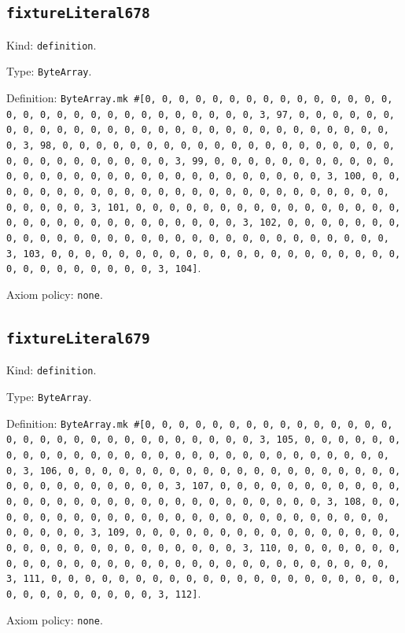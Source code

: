 \documentclass[11pt]{article}
\begin{document}
\subsection*{\texttt{fixtureLiteral678}}
\noindent Kind: \texttt{definition}.\par
\noindent Type: \texttt{ByteArray}.\par
\noindent Definition: \texttt{ByteArray.mk \#[0, 0, 0, 0, 0, 0, 0, 0, 0, 0, 0, 0, 0, 0, 0, 0, 0, 0, 0, 0, 0, 0, 0, 0, 0, 0, 0, 0, 0, 0, 3, 97, 0, 0, 0, 0, 0, 0, 0, 0, 0, 0, 0, 0, 0, 0, 0, 0, 0, 0, 0, 0, 0, 0, 0, 0, 0, 0, 0, 0, 0, 0, 3, 98, 0, 0, 0, 0, 0, 0, 0, 0, 0, 0, 0, 0, 0, 0, 0, 0, 0, 0, 0, 0, 0, 0, 0, 0, 0, 0, 0, 0, 0, 0, 3, 99, 0, 0, 0, 0, 0, 0, 0, 0, 0, 0, 0, 0, 0, 0, 0, 0, 0, 0, 0, 0, 0, 0, 0, 0, 0, 0, 0, 0, 0, 0, 3, 100, 0, 0, 0, 0, 0, 0, 0, 0, 0, 0, 0, 0, 0, 0, 0, 0, 0, 0, 0, 0, 0, 0, 0, 0, 0, 0, 0, 0, 0, 0, 3, 101, 0, 0, 0, 0, 0, 0, 0, 0, 0, 0, 0, 0, 0, 0, 0, 0, 0, 0, 0, 0, 0, 0, 0, 0, 0, 0, 0, 0, 0, 0, 3, 102, 0, 0, 0, 0, 0, 0, 0, 0, 0, 0, 0, 0, 0, 0, 0, 0, 0, 0, 0, 0, 0, 0, 0, 0, 0, 0, 0, 0, 0, 0, 3, 103, 0, 0, 0, 0, 0, 0, 0, 0, 0, 0, 0, 0, 0, 0, 0, 0, 0, 0, 0, 0, 0, 0, 0, 0, 0, 0, 0, 0, 0, 0, 3, 104]}.\par
\noindent Axiom policy: \texttt{none}.\par
\subsection*{\texttt{fixtureLiteral679}}
\noindent Kind: \texttt{definition}.\par
\noindent Type: \texttt{ByteArray}.\par
\noindent Definition: \texttt{ByteArray.mk \#[0, 0, 0, 0, 0, 0, 0, 0, 0, 0, 0, 0, 0, 0, 0, 0, 0, 0, 0, 0, 0, 0, 0, 0, 0, 0, 0, 0, 0, 0, 3, 105, 0, 0, 0, 0, 0, 0, 0, 0, 0, 0, 0, 0, 0, 0, 0, 0, 0, 0, 0, 0, 0, 0, 0, 0, 0, 0, 0, 0, 0, 0, 3, 106, 0, 0, 0, 0, 0, 0, 0, 0, 0, 0, 0, 0, 0, 0, 0, 0, 0, 0, 0, 0, 0, 0, 0, 0, 0, 0, 0, 0, 0, 0, 3, 107, 0, 0, 0, 0, 0, 0, 0, 0, 0, 0, 0, 0, 0, 0, 0, 0, 0, 0, 0, 0, 0, 0, 0, 0, 0, 0, 0, 0, 0, 0, 3, 108, 0, 0, 0, 0, 0, 0, 0, 0, 0, 0, 0, 0, 0, 0, 0, 0, 0, 0, 0, 0, 0, 0, 0, 0, 0, 0, 0, 0, 0, 0, 3, 109, 0, 0, 0, 0, 0, 0, 0, 0, 0, 0, 0, 0, 0, 0, 0, 0, 0, 0, 0, 0, 0, 0, 0, 0, 0, 0, 0, 0, 0, 0, 3, 110, 0, 0, 0, 0, 0, 0, 0, 0, 0, 0, 0, 0, 0, 0, 0, 0, 0, 0, 0, 0, 0, 0, 0, 0, 0, 0, 0, 0, 0, 0, 3, 111, 0, 0, 0, 0, 0, 0, 0, 0, 0, 0, 0, 0, 0, 0, 0, 0, 0, 0, 0, 0, 0, 0, 0, 0, 0, 0, 0, 0, 0, 0, 3, 112]}.\par
\noindent Axiom policy: \texttt{none}.\par
\end{document}
